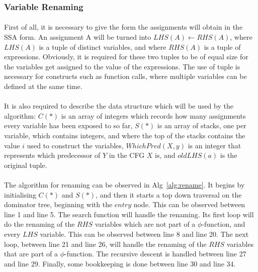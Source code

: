 \subsubsection{Variable Renaming}
\paragraph{}
First of all, it is necessary to give the form the assignments will obtain in the SSA form. An assignment A will be turned into $LHS(A) \leftarrow RHS(A)$, where $LHS(A)$ is a tuple of distinct variables, and where $RHS(A)$ is a tuple of expressions. Obviously, it is required for these two tuples to be of equal size for the variables get assigned to the value of the expressions. The use of tuple is necessary for constructs such as function calls, where multiple variables can be defined at the same time.

\paragraph{}
It is also required to describe the data structure which will be used by the algorithm: $C(*)$ is an array of integers which records how many assignments every variable has been exposed to so far, $S(*)$ is an array of stacks, one per variable, which contains integers, and where the top of the stacks contains the value $i$ used to construct the variables, $WhichPred(X, y)$ is an integer that represents which predecessor of $Y$ in the CFG $X$ is, and $oldLHS(a)$ is the original tuple.

\paragraph{}
The algorithm for renaming can be observed in Alg~\ref{alg:rename}. It begins by initialising $C(*)$ and $S(*)$, and then it starts a top down traversal on the dominator tree, beginning with the $entry$ node. This can be observed between line 1 and line 5. The search function will handle the renaming. Its first loop will do the renaming of the $RHS$ variables which are not part of a $\phi$-function, and every $LHS$ variable. This can be observed between line 8 and line 20. The next loop, between line 21 and line 26, will handle the renaming of the $RHS$ variables that are part of a $\phi$-function. The recursive descent is handled between line 27 and line 29. Finally, some bookkeeping is done between line 30 and line 34.

